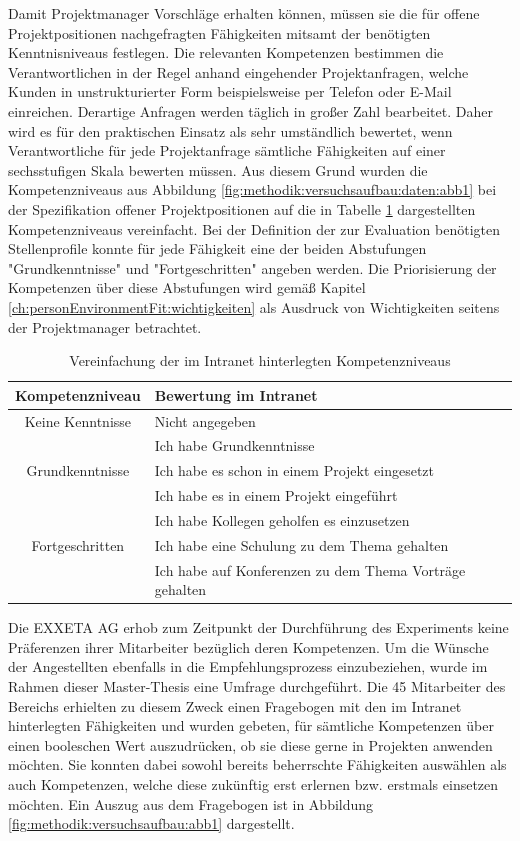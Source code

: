 Damit Projektmanager Vorschläge erhalten können, müssen sie die für offene Projektpositionen nachgefragten Fähigkeiten mitsamt der benötigten Kenntnisniveaus festlegen. Die relevanten Kompetenzen bestimmen die Verantwortlichen in der Regel anhand eingehender Projektanfragen, welche Kunden in unstrukturierter Form beispielsweise per Telefon oder E-Mail einreichen. Derartige Anfragen werden täglich in großer Zahl bearbeitet. Daher wird es für den praktischen Einsatz als sehr umständlich bewertet, wenn Verantwortliche für jede Projektanfrage sämtliche Fähigkeiten auf einer sechsstufigen Skala bewerten müssen. Aus diesem Grund wurden die Kompetenzniveaus aus Abbildung \ref{fig:methodik:versuchsaufbau:daten:abb1} bei der Spezifikation offener Projektpositionen auf die in Tabelle \ref{tbl:methodik:versuchsaufbau:systemarchitektur:matrixservice:tbl1} dargestellten Kompetenzniveaus vereinfacht. Bei der Definition der zur Evaluation benötigten Stellenprofile konnte für jede Fähigkeit eine der beiden Abstufungen "Grundkenntnisse" und "Fortgeschritten" angeben werden. Die Priorisierung der Kompetenzen über diese Abstufungen wird gemäß Kapitel \ref{ch:personEnvironmentFit:wichtigkeiten} als Ausdruck von Wichtigkeiten seitens der Projektmanager betrachtet.

\begin{table}[h]
	\centering
	\begin{tabularx}{\textwidth}{c|X}
		\textbf{Kompetenzniveau} & \textbf{Bewertung im Intranet}\\
		\hline
		Keine Kenntnisse & Nicht angegeben\\
		\hline
		& Ich habe Grundkenntnisse\\
		Grundkenntnisse & Ich habe es schon in einem Projekt eingesetzt\\
		& Ich habe es in einem Projekt eingeführt\\
		\hline
		& Ich habe Kollegen geholfen es einzusetzen\\
		Fortgeschritten & Ich habe eine Schulung zu dem Thema gehalten\\
		& Ich habe auf Konferenzen zu dem Thema Vorträge gehalten\\
		\hline
	\end{tabularx}
	\caption{Vereinfachung der im Intranet hinterlegten Kompetenzniveaus}
	\label{tbl:methodik:versuchsaufbau:systemarchitektur:matrixservice:tbl1}
\end{table}

Die EXXETA AG erhob zum Zeitpunkt der Durchführung des Experiments keine Präferenzen ihrer Mitarbeiter bezüglich deren Kompetenzen. Um die Wünsche der Angestellten ebenfalls in die Empfehlungsprozess einzubeziehen, wurde im Rahmen dieser Master-Thesis eine Umfrage durchgeführt. Die 45 Mitarbeiter des Bereichs \JES erhielten zu diesem Zweck einen Fragebogen mit den \anzFaehigkeiten im Intranet hinterlegten Fähigkeiten und wurden gebeten, für sämtliche Kompetenzen über einen booleschen Wert auszudrücken, ob sie diese gerne in Projekten anwenden möchten. Sie konnten dabei sowohl bereits beherrschte Fähigkeiten auswählen als auch Kompetenzen, welche diese zukünftig erst erlernen bzw. erstmals einsetzen möchten. Ein Auszug aus dem Fragebogen ist in Abbildung \ref{fig:methodik:versuchsaufbau:abb1} dargestellt.

